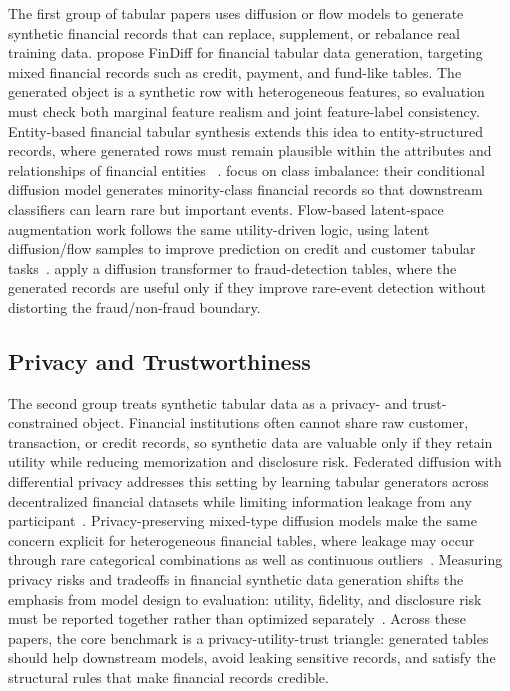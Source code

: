 \documentclass[sigconf,nonacm]{acmart}
\begin{document}
The first group of tabular papers uses diffusion or flow models to generate
synthetic financial records that can replace, supplement, or rebalance real
training data. \citet{sattarov2023findiff} propose FinDiff for financial tabular
data generation, targeting mixed financial records such as credit, payment, and
fund-like tables. The generated object is a synthetic row with heterogeneous
features, so evaluation must check both marginal feature realism and joint
feature-label consistency. Entity-based financial tabular synthesis extends this
idea to entity-structured records, where generated rows must remain plausible
within the attributes and relationships of financial entities
~\cite{liu2024enttabdiff}. \citet{sattarov2024imbfindiff} focus on class imbalance:
their conditional diffusion model generates minority-class financial records so
that downstream classifiers can learn rare but important events. Flow-based
latent-space augmentation work follows the same utility-driven logic, using
latent diffusion/flow samples to improve prediction on credit and customer
tabular tasks~\cite{ihsan2025latentflow}. \citet{kuo2026emdt} apply a diffusion
transformer to fraud-detection tables, where the generated records are useful
only if they improve rare-event detection without distorting the fraud/non-fraud
boundary.

\subsection{Privacy and Trustworthiness}\label{sec:tabular-privacy}

The second group treats synthetic tabular data as a privacy- and
trust-constrained object. Financial institutions often cannot share raw customer,
transaction, or credit records, so synthetic data are valuable only if they
retain utility while reducing memorization and disclosure risk. Federated
diffusion with differential privacy addresses this setting by learning tabular
generators across decentralized financial datasets while limiting information
leakage from any participant~\cite{sattarov2024dpfedtabdiff}. Privacy-preserving
mixed-type diffusion models make the same concern explicit for heterogeneous
financial tables, where leakage may occur through rare categorical combinations
as well as continuous outliers~\cite{sattarov2025dpfindiff}. Measuring privacy
risks and tradeoffs in financial synthetic data generation shifts the emphasis
from model design to evaluation: utility, fidelity, and disclosure risk must be
reported together rather than optimized separately~\cite{zuo2026privacyrisks}.
Across these papers, the core benchmark is a privacy-utility-trust triangle:
generated tables should help downstream models, avoid leaking sensitive records,
and satisfy the structural rules that make financial records credible.
\end{document}
